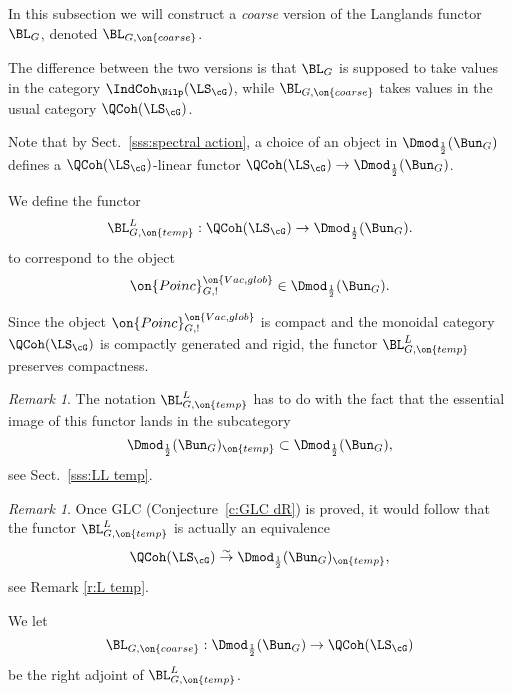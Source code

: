 \documentclass[9pt]{amsart}
\theoremstyle{remark}
\newtheorem{rem}[subsubsection]{Remark}
\theoremstyle{definition}
\theoremstyle{remark}
\newcommand{\secref}[1]{Sect.~\ref{#1}}
\newcommand{\conjref}[1]{Conjecture~\ref{#1}}
\numberwithin{equation}{section}
\begin{document}
 \label{ss:coarse}

In this subsection we will construct a \emph{coarse} version of the Langlands functor $\BL_G$,
denoted $\BL_{G,\on{coarse}}$. 

\medskip

The difference between the two versions is that $\BL_G$ is supposed to
take values in the category $\IndCoh_\Nilp(\LS_\cG)$, while $\BL_{G,\on{coarse}}$ takes values
in the usual category $\QCoh(\LS_\cG)$. 

\sssec{}

Note that by \secref{sss:spectral action}, a choice of an object in $\Dmod_{\frac{1}{2}}(\Bun_G)$
defines a $\QCoh(\LS_\cG)$-linear functor $\QCoh(\LS_\cG)\to \Dmod_{\frac{1}{2}}(\Bun_G)$. 

\sssec{}

We define the functor
\begin{equation} \label{e:LL temp}
\BL^L_{G,\on{temp}}:\QCoh(\LS_\cG)\to \Dmod_{\frac{1}{2}}(\Bun_G).
\end{equation}
to correspond to the object 
\begin{equation} \label{e:Poinc Vac glob}
\on{Poinc}^{\on{Vac,glob}}_{G,!}\in  \Dmod_{\frac{1}{2}}(\Bun_G).
\end{equation}

\medskip 

Since the object $\on{Poinc}^{\on{Vac,glob}}_{G,!}$ is compact and the monoidal category $\QCoh(\LS_\cG)$
is compactly generated and rigid, the functor $\BL^L_{G,\on{temp}}$ preserves compactness.

\begin{rem}
The notation $\BL^L_{G,\on{temp}}$ has to do with the fact that the essential image 
of this functor lands in the subcategory 
$$\Dmod_{\frac{1}{2}}(\Bun_G)_{\on{temp}}\subset \Dmod_{\frac{1}{2}}(\Bun_G),$$
see \secref{sss:LL temp}.
\end{rem} 

\begin{rem}

Once GLC (\conjref{c:GLC dR}) is proved, it would follow that the functor $\BL^L_{G,\on{temp}}$
is actually an equivalence
$$\QCoh(\LS_\cG)\overset{\sim}\to \Dmod_{\frac{1}{2}}(\Bun_G)_{\on{temp}},$$
see Remark \ref{r:L temp}.

\end{rem} 

\sssec{}

We let 
$$\BL_{G,\on{coarse}}:\Dmod_{\frac{1}{2}}(\Bun_G)\to \QCoh(\LS_\cG)$$
be the right adjoint of $\BL^L_{G,\on{temp}}$.
\end{document}
